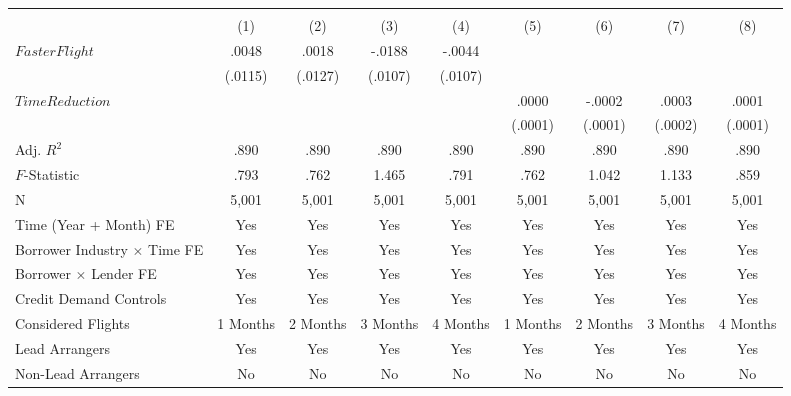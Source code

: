 \renewcommand{\arraystretch}{1.2}\begin{tabular}{lcccccccc}  \midrule \midrule  &  &  \\  \cmidrule(lr){2-5} \cmidrule(lr){6-9}  & (1) & (2) & (3) & (4) & (5) & (6) & (7) & (8) \\  
 \midrule
$FasterFlight$      &       .0048         &       .0018         &      -.0188\sym{*}  &      -.0044         &                     &                     &                     &                     \\
                    &     (.0115)         &     (.0127)         &     (.0107)         &     (.0107)         &                     &                     &                     &                     \\
\addlinespace
$TimeReduction$     &                     &                     &                     &                     &       .0000         &      -.0002         &       .0003         &       .0001         \\
                    &                     &                     &                     &                     &     (.0001)         &     (.0001)         &     (.0002)         &     (.0001)         \\
\midrule
Adj. $R^2$          &        .890         &        .890         &        .890         &        .890         &        .890         &        .890         &        .890         &        .890         \\
$F$-Statistic       &        .793         &        .762         &       1.465         &        .791         &        .762         &       1.042         &       1.133         &        .859         \\
N                   &       5,001         &       5,001         &       5,001         &       5,001         &       5,001         &       5,001         &       5,001         &       5,001         \\
\midrule Time (Year + Month) FE & Yes & Yes & Yes & Yes & Yes & Yes & Yes & Yes \\ Borrower Industry $\times$ Time FE & Yes & Yes & Yes & Yes & Yes & Yes & Yes & Yes \\ Borrower $\times$ Lender FE & Yes & Yes & Yes & Yes & Yes & Yes & Yes & Yes  \\ Credit Demand Controls & Yes & Yes & Yes & Yes & Yes & Yes & Yes & Yes \\ Considered Flights & \small{1 Months} & \small{2 Months}  & \small{3 Months}  & \small{4 Months} & \small{1 Months} & \small{2 Months} & \small{3 Months} & \small{4 Months} \\ \midrule Lead Arrangers & Yes & Yes & Yes & Yes & Yes & Yes & Yes & Yes \\ Non-Lead Arrangers & No & No & No & No & No & No & No & No \\ \midrule \midrule \end{tabular} \renewcommand{\arraystretch}{1} 
